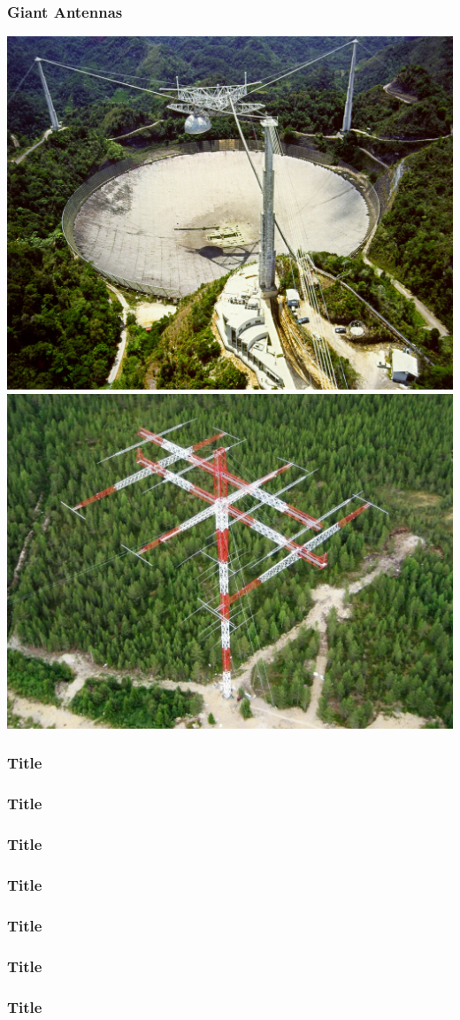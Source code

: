 \documentclass[10pt]{beamer}
\begin{document}
\begin{frame}
\frametitle{Giant Antennas}
\includegraphics[width=.49\textwidth]{arecibo.jpg}
\includegraphics[width=.49\textwidth]{160myagi.jpg}
\end{frame}

\begin{frame}
\frametitle{Title}

\end{frame}

\begin{frame}
\frametitle{Title}

\end{frame}

\begin{frame}
\frametitle{Title}

\end{frame}

\begin{frame}
\frametitle{Title}

\end{frame}

\begin{frame}
\frametitle{Title}

\end{frame}

\begin{frame}
\frametitle{Title}

\end{frame}

\begin{frame}
\frametitle{Title}

\end{frame}
\end{document}
